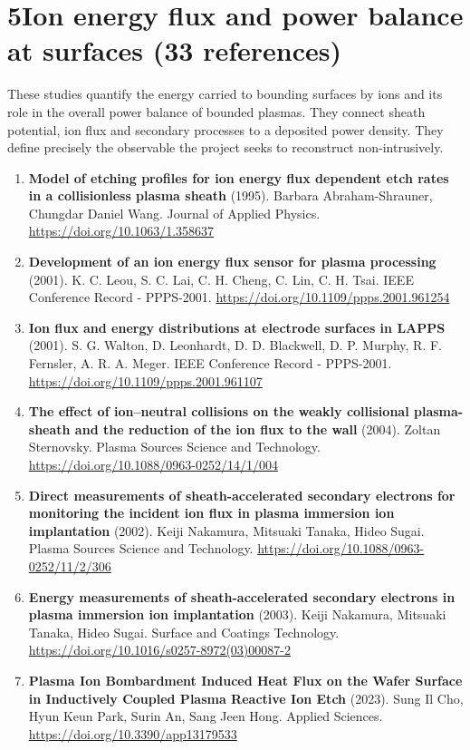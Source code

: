 \documentclass[11pt,a4paper]{article}
\begin{document}
\section*{5\quad Ion energy flux and power balance at surfaces \textnormal{(\normalsize 33 references)}}
These studies quantify the energy carried to bounding surfaces by ions and its role in the overall power balance of bounded plasmas. They connect sheath potential, ion flux and secondary processes to a deposited power density. They define precisely the observable the project seeks to reconstruct non-intrusively.
\begin{enumerate}[leftmargin=1.4em]
\item \textbf{Model of etching profiles for ion energy flux dependent etch rates in a collisionless plasma sheath} (1995). Barbara Abraham-Shrauner, Chungdar Daniel Wang. Journal of Applied Physics. \url{https://doi.org/10.1063/1.358637}
\item \textbf{Development of an ion energy flux sensor for plasma processing} (2001). K. C. Leou, S. C. Lai, C. H. Cheng, C. Lin, C. H. Tsai. IEEE Conference Record - PPPS-2001. \url{https://doi.org/10.1109/ppps.2001.961254}
\item \textbf{Ion flux and energy distributions at electrode surfaces in LAPPS} (2001). S. G. Walton, D. Leonhardt, D. D. Blackwell, D. P. Murphy, R. F. Fernsler, A. R. A. Meger. IEEE Conference Record - PPPS-2001. \url{https://doi.org/10.1109/ppps.2001.961107}
\item \textbf{The effect of ion–neutral collisions on the weakly collisional plasma-sheath and the reduction of the ion flux to the wall} (2004). Zoltan Sternovsky. Plasma Sources Science and Technology. \url{https://doi.org/10.1088/0963-0252/14/1/004}
\item \textbf{Direct measurements of sheath-accelerated secondary electrons for monitoring the incident ion flux in plasma immersion ion implantation} (2002). Keiji Nakamura, Mitsuaki Tanaka, Hideo Sugai. Plasma Sources Science and Technology. \url{https://doi.org/10.1088/0963-0252/11/2/306}
\item \textbf{Energy measurements of sheath-accelerated secondary electrons in plasma immersion ion implantation} (2003). Keiji Nakamura, Mitsuaki Tanaka, Hideo Sugai. Surface and Coatings Technology. \url{https://doi.org/10.1016/s0257-8972(03)00087-2}
\item \textbf{Plasma Ion Bombardment Induced Heat Flux on the Wafer Surface in Inductively Coupled Plasma Reactive Ion Etch} (2023). Sung Il Cho, Hyun Keun Park, Surin An, Sang Jeen Hong. Applied Sciences. \url{https://doi.org/10.3390/app13179533}

\end{enumerate}
\end{document}
